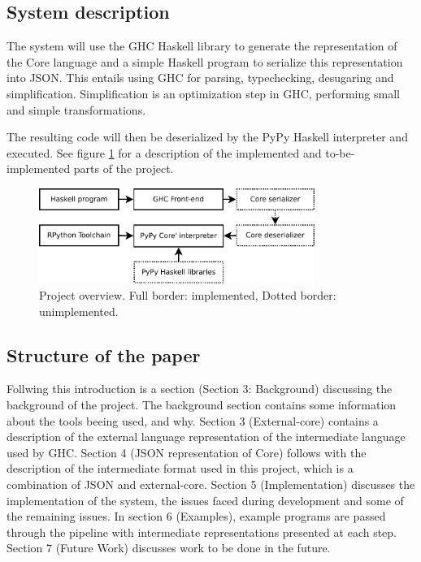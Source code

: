\subsection{System description}

The system will use the GHC Haskell library to generate the 
representation of the Core language and a simple Haskell program to 
serialize this representation into JSON. This entails using GHC for
parsing, typechecking, desugaring and simplification. Simplification
is an optimization step in GHC, performing small and simple transformations.

The resulting code will then be deserialized by the PyPy Haskell interpreter 
and executed. See figure \ref{overview} for a description of the implemented and
to-be-implemented parts of the project.

\begin{figure}[H]
\centering
\includegraphics[width=0.8\textwidth]{diags/overview}
\caption{Project overview. Full border: implemented, Dotted border: unimplemented.}
\label{overview}
\end{figure}

\subsection{Structure of the paper}

Follwing this introduction is a section (Section 3: Background) discussing the 
background of the project. The background section contains some information about 
the tools beeing used, and why.
Section 3 (External-core) contains a description of the external language representation
of the intermediate language used by GHC.
Section 4 (JSON representation of Core) follows with the description of the intermediate format
used in this project, which is a combination of JSON and external-core.
Section 5 (Implementation) discusses the implementation of the system, the issues faced
during development and some of the remaining issues.
In section 6 (Examples), example programs are passed through the pipeline with intermediate
representations presented at each step.
Section 7 (Future Work) discusses work to be done in the future.


